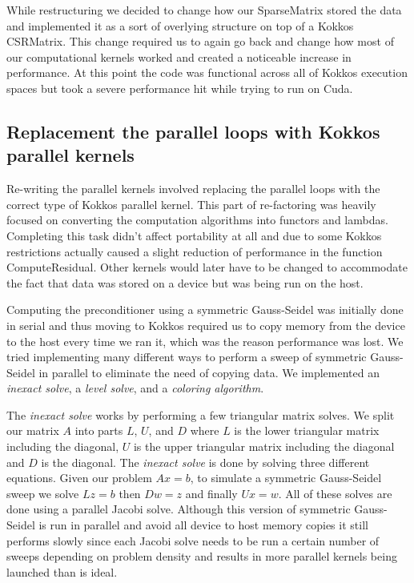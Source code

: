 \documentclass{ccr15}
\begin{document}
While restructuring we decided to change how our SparseMatrix stored the data and implemented it
as a sort of overlying structure on top of a Kokkos CSRMatrix. This change required us to again
go back and change how most of our computational kernels worked and created a noticeable increase
in performance. At this point the code was functional across all of Kokkos execution spaces but
took a severe performance hit while trying to run on Cuda. 


\subsection{Replacement the parallel loops with Kokkos parallel kernels}

Re-writing the parallel kernels involved replacing the parallel loops with the correct type of
Kokkos parallel kernel. This part of re-factoring was heavily focused on converting the
computation algorithms into functors and lambdas. Completing this task didn't affect portability
at all and due to some Kokkos restrictions actually caused a slight reduction of performance in
the function ComputeResidual. Other kernels would later have to be changed to accommodate the fact
that data was stored on a device but was being run on the host.

Computing the preconditioner using a symmetric Gauss-Seidel was initially done in serial and thus
moving to Kokkos required us to copy memory from the device to the host every time we ran it,
which was the reason performance was lost. We tried implementing many different ways to perform
a sweep of symmetric Gauss-Seidel in parallel to eliminate the need of copying data. We
implemented an \emph{inexact solve}, a \emph{level solve}, and a \emph{coloring algorithm}.


The \emph{inexact solve} works by performing a few triangular matrix solves. We split our matrix $A$ into
parts $L$, $U$, and $D$ where $L$ is the lower triangular matrix including the diagonal, $U$ is the upper
triangular matrix including the diagonal and $D$ is the diagonal. The \emph{inexact solve} is done by solving three
different equations. Given our problem $A x = b$, to simulate a symmetric Gauss-Seidel sweep we solve
$L z = b$ then $D w = z$ and finally $U x = w$. All of these solves are done using a parallel Jacobi solve.
Although this version of symmetric Gauss-Seidel is run in parallel and avoid all device to host memory
copies it still performs slowly since each Jacobi solve needs to be run a certain number of sweeps depending
on problem density and results in more parallel kernels being launched than is ideal.
\end{document}
